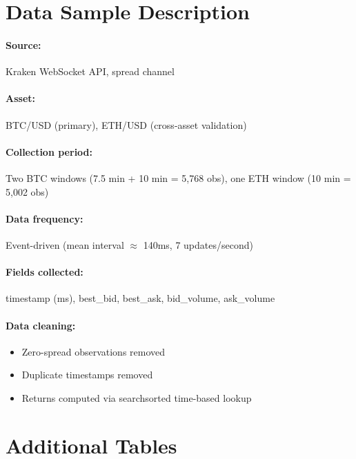 \documentclass[12pt,a4paper]{article}
\begin{document}
\newpage
\begin{appendices}

\section{Data Sample Description}

\paragraph{Source:} Kraken WebSocket API, spread channel

\paragraph{Asset:} BTC/USD (primary), ETH/USD (cross-asset validation)

\paragraph{Collection period:} Two BTC windows (7.5 min + 10 min = 5,768 obs), one ETH window (10 min = 5,002 obs)

\paragraph{Data frequency:} Event-driven (mean interval $\approx$ 140ms, 7 updates/second)

\paragraph{Fields collected:} timestamp (ms), best\_bid, best\_ask, bid\_volume, ask\_volume

\paragraph{Data cleaning:}
\begin{itemize}
    \item Zero-spread observations removed
    \item Duplicate timestamps removed
    \item Returns computed via searchsorted time-based lookup
\end{itemize}

\section{Additional Tables}


\end{appendices}
\end{document}
